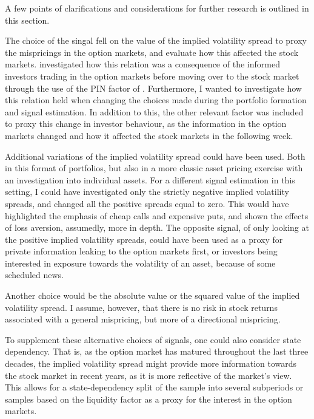 
A few points of clarifications and considerations for further research is outlined in this section.

The choice of the singal fell on the value of the implied volatility spread to proxy the mispricings in the option markets, and evaluate how this affected the stock markets. \cite{cremers2010deviations} investigated how this relation was a consequence of the informed investors trading in the option markets before moving over to the stock market through the use of the PIN factor of \cite{pan2006information}. Furthermore, I wanted to investigate how this relation held when changing the choices made during the portfolio formation and signal estimation. In addition to this, the other relevant factor was included to proxy this change in investor behaviour, as the information in the option markets changed and how it affected the stock markets in the following week. 

Additional variations of the implied volatility spread could have been used. Both in this format of portfolios, but also in a more classic asset pricing exercise with an investigation into individual assets. For a different signal estimation in this setting, I could have investigated only the strictly negative implied volatility spreads, and changed all the positive spreads equal to zero. This would have highlighted the emphasis of cheap calls and expensive puts, and shown the effects of loss aversion, assumedly, more in depth. The opposite signal, of only looking at the positive implied volatility spreads, could have been used as a proxy for private information leaking to the option markets first, or investors being interested in exposure towards the volatility of an asset, because of some scheduled news. 

Another choice would be the absolute value or the squared value of the implied volatility spread. I assume, however, that there is no risk in stock returns associated with a general mispricing, but more of a directional mispricing. 

To supplement these alternative choices of signals, one could also consider state dependency. That is, as the option market has matured throughout the last three decades, the implied volatility spread might provide more information towards the stock market in recent years, as it is more reflective of the market's view. This allows for a state-dependency split of the sample into several subperiods or samples based on the liquidity factor as a proxy for the interest in the option markets.

